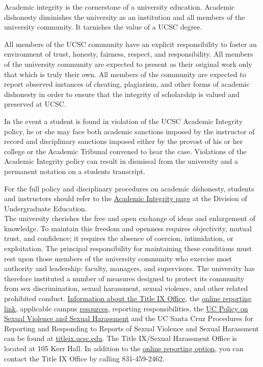 \documentclass[11pt]{article}
\begin{document}
 Academic integrity is the cornerstone of a university education. Academic dishonesty diminishes
the university as an institution and all members of the university community. It tarnishes the
value of a UCSC degree.

All members of the UCSC community have an explicit responsibility to foster an environment of
trust, honesty, fairness, respect, and responsibility. All members of the university community are
expected to present as their original work only that which is truly their own. All members of the
community are expected to report observed instances of cheating, plagiarism, and other forms
of academic dishonesty in order to ensure that the integrity of scholarship is valued and
preserved at UCSC.

In the event a student is found in violation of the UCSC Academic Integrity policy, he or she may
face both academic sanctions imposed by the instructor of record and disciplinary sanctions
imposed either by the provost of his or her college or the Academic Tribunal convened to hear
the case. Violations of the Academic Integrity policy can result in dismissal from the university
and a permanent notation on a students transcript.

For the full policy and disciplinary procedures on academic dishonesty, students and instructors
should refer to the \href{https://www.ue.ucsc.edu/academic_misconduct}{Academic Integrity page} at the Division of Undergraduate Education. \\

 The university cherishes the free and open exchange of ideas and enlargement of knowledge.
To maintain this freedom and openness requires objectivity, mutual trust, and confidence; it
requires the absence of coercion, intimidation, or exploitation. The principal responsibility for
maintaining these conditions must rest upon those members of the university community who
exercise most authority and leadership: faculty, managers, and supervisors.
The university has therefore instituted a number of measures designed to protect its community
from sex discrimination, sexual harassment, sexual violence, and other related prohibited
conduct. \href{https://titleix.ucsc.edu/}{Information about the Title IX Office}, the \href{https://ucsc-gme-advocate.symplicity.com/public_report/index.php/pid681212?}{online reporting link}, applicable campus
\href{https://titleix.ucsc.edu/Resources\%20and\%20Options\%202.18.pdf}{resources}, reporting responsibilities, the \href{https://policy.ucop.edu/doc/4000385/SVSH}{UC Policy on Sexual Violence and Sexual Harassment}
and the UC Santa Cruz Procedures for Reporting and Responding to Reports of Sexual
Violence and Sexual Harassment can be found at \href{titleix.ucsc.edu}{titleix.ucsc.edu}.
The Title IX/Sexual Harassment Office is located at 105 Kerr Hall. In addition to the \href{https://ucsc-gme-advocate.symplicity.com/public_report/index.php/pid681212?}{online
reporting option}, you can contact the Title IX Office by calling 831-459-2462. 
\end{document}
